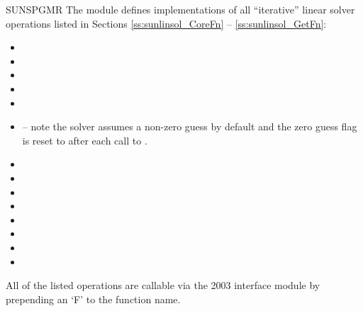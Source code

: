 {SUNSPGMR}
%
%
The {\sunlinsolspgmr} module defines implementations of all
``iterative'' linear solver operations listed in Sections
\ref{ss:sunlinsol_CoreFn} -- \ref{ss:sunlinsol_GetFn}:
\begin{itemize}
\item {}
\item {}
\item {}
\item {}
\item {}
\item {} -- note the solver assumes a non-zero
  guess by default and the zero guess flag is reset to  after each
  call to .
\item {}
\item {}
\item {}
\item {}
\item {}
\item {}
\item {}
\item {}
\end{itemize}
All of the listed operations are callable via the {\F} 2003 interface module
by prepending an `F' to the function name.


